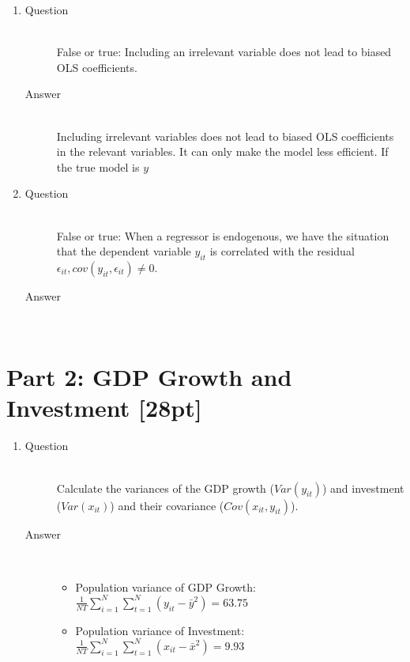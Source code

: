 \documentclass{article}
\begin{document}
\begin{enumerate}
  \item
  \begin{description}
    \item[Question] \hfill \\
    False or true: Including an irrelevant variable does not lead to biased OLS coefficients.
    \item[Answer] \hfill \\
    Including irrelevant variables does not lead to biased OLS coefficients in the relevant variables. It can only make the model less efficient. If the true model is $y$
  \end{description}
  
  \item
  \begin{description}
    \item[Question] \hfill \\
    False or true: When a regressor is endogenous, we have the situation that the dependent variable $y_{it}$ is correlated with the residual $\epsilon_{it},cov(y_{it},\epsilon_{it}) \neq 0$.
    \item[Answer] \hfill \\

  \end{description}
  
\end{enumerate}

\section{Part 2: GDP Growth and Investment [28pt]}

\begin{enumerate}
  \item
  \begin{description}
    \item[Question] \hfill \\
    Calculate the variances of the GDP growth ($Var(y_{it})$) and investment ($Var(x_{it})$) and their covariance ($Cov(x_{it},y_{it})$).
    \item[Answer] \hfill \\
    \begin{itemize}
      \item Population variance of GDP Growth: $\frac{1}{NT} \sum^{N}_{i=1} \sum^{N}_{t=1} (y_{it}-\bar{y}^{2}) = 63.75$
      \item Population variance of Investment: $\frac{1}{NT} \sum^{N}_{i=1} \sum^{N}_{t=1} (x_{it}-\bar{x}^{2}) = 9.93$
    \end{itemize}
  \end{description}
  
\end{enumerate}
\end{document}
